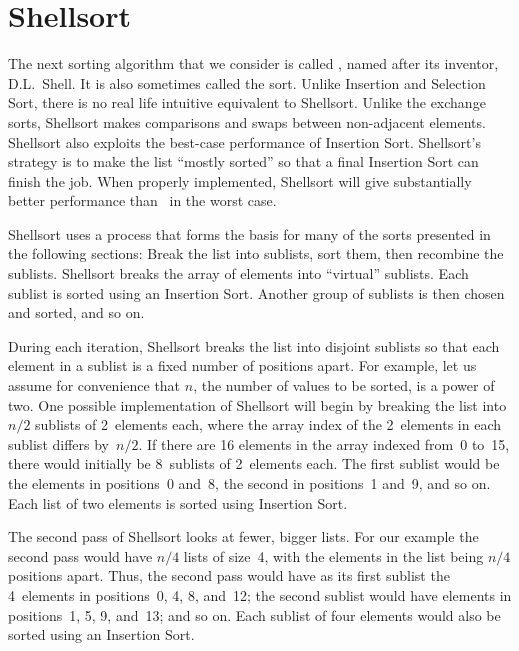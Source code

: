 \section{Shellsort}
\label{ShellSort}

The next sorting algorithm that we consider is called
, named after its inventor, D.L.~Shell.
It is also sometimes called the 
sort.
Unlike Insertion and Selection Sort, there is no real life intuitive
equivalent to Shellsort.
Unlike the exchange sorts, Shellsort makes comparisons and swaps
between non-adjacent elements.
Shellsort also exploits the best-case performance
of Insertion Sort.
Shellsort's strategy is to make the list ``mostly sorted'' so that a
final Insertion Sort can finish the job. 
When properly implemented, Shellsort will give substantially better
performance than \Thetantwo\ in the worst case.

Shellsort uses a process that forms the basis for many of the sorts
presented in the following sections:
Break the list into sublists, sort them, then recombine the sublists.
Shellsort breaks the array of elements into ``virtual'' sublists.
Each sublist is sorted using an Insertion Sort.
Another group of sublists is then chosen and sorted, and so on.

During each iteration, Shellsort breaks the list into disjoint
sublists so that each element in a sublist is a fixed number of
positions apart.
For example, let us assume for convenience that \(n\), the number of
values to be sorted, is a power of two.
One possible implementation of Shellsort will begin by breaking
the list into \(n/2\) sublists of 2~elements each, where the array
index of the 2~elements in each sublist differs by~\(n/2\).
If there are 16 elements in the array indexed from~0 to~15,
there would initially be 8~sublists of 2~elements each.
The first sublist would be the elements in positions~0 and~8,
the second in positions~1 and~9, and so on.
Each list of two elements is sorted using Insertion Sort.

The second pass of Shellsort looks at fewer, bigger lists.
For our example the second pass would have \(n/4\) lists of size~4,
with the elements in the list being \(n/4\) positions apart.
Thus, the second pass would have as its first sublist the 4~elements
in positions~0, 4, 8, and~12;
the second sublist would have elements in positions~1, 5, 9, and~13;
and so on.
Each sublist of four elements would also be sorted using an Insertion
Sort.

